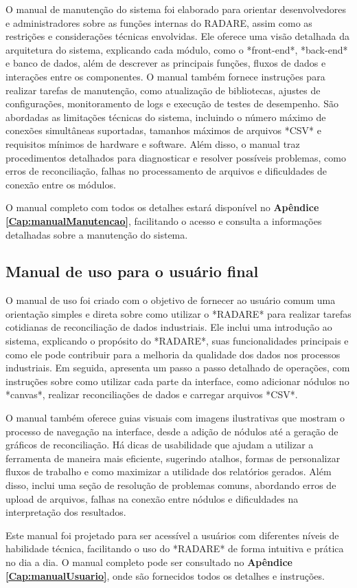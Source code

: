 O manual de manutenção do sistema foi elaborado para orientar desenvolvedores e administradores sobre as funções internas do RADARE, assim como as restrições e considerações técnicas envolvidas. Ele oferece uma visão detalhada da arquitetura do sistema, explicando cada módulo, como o *front-end*, *back-end* e banco de dados, além de descrever as principais funções, fluxos de dados e interações entre os componentes. O manual também fornece instruções para realizar tarefas de manutenção, como atualização de bibliotecas, ajustes de configurações, monitoramento de logs e execução de testes de desempenho. São abordadas as limitações técnicas do sistema, incluindo o número máximo de conexões simultâneas suportadas, tamanhos máximos de arquivos *CSV* e requisitos mínimos de hardware e software. Além disso, o manual traz procedimentos detalhados para diagnosticar e resolver possíveis problemas, como erros de reconciliação, falhas no processamento de arquivos e dificuldades de conexão entre os módulos. 

O manual completo com todos os detalhes estará disponível no \textbf{Apêndice \ref{Cap:manualManutencao}}, facilitando o acesso e consulta a informações detalhadas sobre a manutenção do sistema.

\subsection{Manual de uso para o usuário final}

O manual de uso foi criado com o objetivo de fornecer ao usuário comum uma orientação simples e direta sobre como utilizar o *RADARE* para realizar tarefas cotidianas de reconciliação de dados industriais. Ele inclui uma introdução ao sistema, explicando o propósito do *RADARE*, suas funcionalidades principais e como ele pode contribuir para a melhoria da qualidade dos dados nos processos industriais. Em seguida, apresenta um passo a passo detalhado de operações, com instruções sobre como utilizar cada parte da interface, como adicionar nódulos no *canvas*, realizar reconciliações de dados e carregar arquivos *CSV*.

O manual também oferece guias visuais com imagens ilustrativas que mostram o processo de navegação na interface, desde a adição de nódulos até a geração de gráficos de reconciliação. Há dicas de usabilidade que ajudam a utilizar a ferramenta de maneira mais eficiente, sugerindo atalhos, formas de personalizar fluxos de trabalho e como maximizar a utilidade dos relatórios gerados. Além disso, inclui uma seção de resolução de problemas comuns, abordando erros de upload de arquivos, falhas na conexão entre nódulos e dificuldades na interpretação dos resultados.

Este manual foi projetado para ser acessível a usuários com diferentes níveis de habilidade técnica, facilitando o uso do *RADARE* de forma intuitiva e prática no dia a dia. O manual completo pode ser consultado no \textbf{Apêndice \ref{Cap:manualUsuario}}, onde são fornecidos todos os detalhes e instruções.